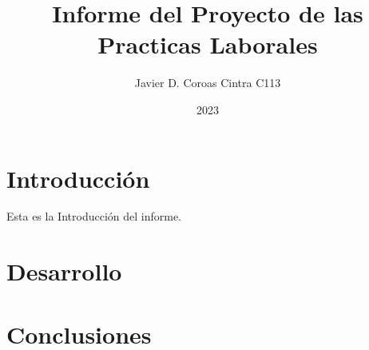 \documentclass{article}
\title{Informe del Proyecto de las Practicas Laborales}
\author{Javier D. Coroas Cintra C113}
\date{2023}
\begin{document}
\maketitle

\section{Introducción} 
Esta es la Introducción del informe.

\section{Desarrollo}
%

\section{Conclusiones}
%
\end{document}
